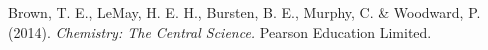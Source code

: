 \clearpage
{}
\addtocounter{page}{1} %
\lipsum[5]
\lipsum[6]
\lipsum[7]
\lipsum[8]

\begin{thebibliography}{99}
     Brown, T. E., LeMay, H. E. H., Bursten, B. E., Murphy, C. \& Woodward, P. (2014). \textit{Chemistry: The Central Science.} Pearson Education Limited. 
\end{thebibliography}


